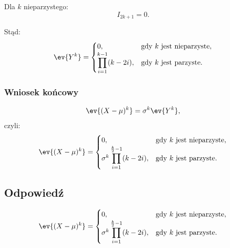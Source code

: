 Dla \(k\) nieparzystego:
\[
	I_{2k+1} = 0.
\]

Stąd:
\[
	\ev{Y^k} =
	\begin{cases}
		0,                                      & \text{gdy \(k\) jest nieparzyste}, \\
		\displaystyle \prod_{i=1}^{k-1} (k-2i), & \text{gdy \(k\) jest parzyste}.
	\end{cases}
\]

\subsubsection*{Wniosek końcowy}

\[
	\ev{(X-\mu)^k} = \sigma^k \ev{Y^k},
\]
czyli:
\[
	\ev{(X-\mu)^k} =
	\begin{cases}
		0,                                                         & \text{gdy \(k\) jest nieparzyste}, \\
		\sigma^k \displaystyle \prod_{i=1}^{\frac{k}{2}-1} (k-2i), & \text{gdy \(k\) jest parzyste}.
	\end{cases}
\]

\subsection*{Odpowiedź}
\[
	\ev{(X-\mu)^k} =
	\begin{cases}
		0,                                                         & \text{gdy \(k\) jest nieparzyste}, \\
		\sigma^k \displaystyle \prod_{i=1}^{\frac{k}{2}-1} (k-2i), & \text{gdy \(k\) jest parzyste}.
	\end{cases}
\]
